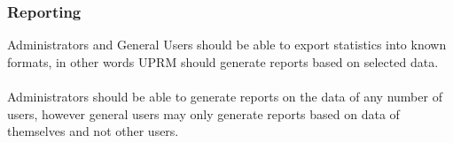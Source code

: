 \subsubsection{Reporting}
Administrators and General Users should be able to export statistics into known formats, in other words UPRM should generate reports based on selected data.\\ \\
Administrators should be able to generate reports on the data of any number of users, however general users may only generate reports based on data of themselves and not other users.

